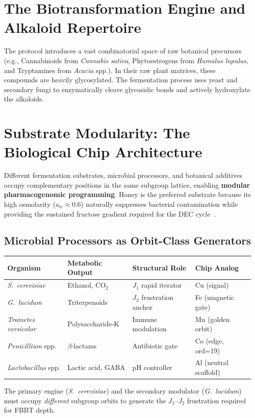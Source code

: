 \section{The Biotransformation Engine and Alkaloid Repertoire}
The protocol introduces a vast combinatorial space of raw botanical precursors (e.g., Cannabinoids from \textit{Cannabis sativa}, Phytoestrogens from \textit{Humulus lupulus}, and Tryptamines from \textit{Acacia} spp.). In their raw plant matrices, these compounds are heavily glycosylated. The fermentation process uses yeast and secondary fungi to enzymatically cleave glycosidic bonds and actively hydroxylate the alkaloids.

\section{Substrate Modularity: The Biological Chip Architecture}
Different fermentation substrates, microbial processors, and botanical additives occupy complementary positions in the same subgroup lattice, enabling \textbf{modular pharmacogenomic programming}. Honey is the preferred substrate because its high osmolarity ($a_w \approx 0.6$) naturally suppresses bacterial contamination while providing the sustained fructose gradient required for the DEC cycle~\cite{Molan1992Honey}.

\subsection{Microbial Processors as Orbit-Class Generators}
\begin{center}
{\small
\begin{tabular}{@{}llll@{}}
\toprule
\textbf{Organism} & \textbf{Metabolic Output} & \textbf{Structural Role} & \textbf{Chip Analog} \\
\midrule
\textit{S.~cerevisiae} & Ethanol, CO$_2$ & $J_1$ rapid iterator & Cu (signal) \\
\textit{G.~lucidum} & Triterpenoids & $J_2$ frustration anchor & Fe (magnetic gate) \\
\textit{Trametes versicolor} & Polysaccharide-K & Immune modulation & Mn (golden orbit) \\
\textit{Penicillium} spp. & $\beta$-lactams & Antibiotic gate & Co (edge, ord=19) \\
\textit{Lactobacillus} spp. & Lactic acid, GABA & pH controller & Al (neutral scaffold) \\
\bottomrule
\end{tabular}
}
\end{center}
The primary engine (\textit{S.~cerevisiae}) and the secondary modulator (\textit{G.~lucidum}) must occupy \emph{different} subgroup orbits to generate the $J_1$--$J_2$ frustration required for FBBT depth.

